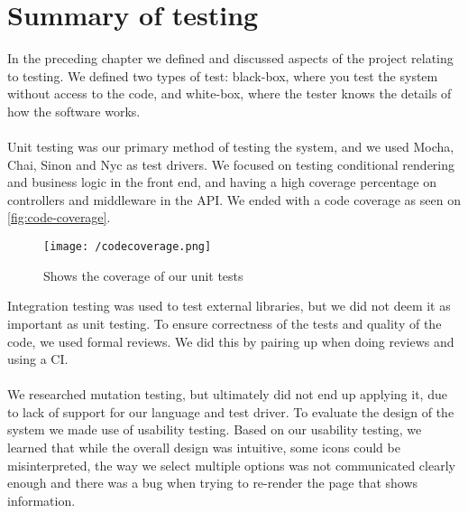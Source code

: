 \section{Summary of testing}
In the preceding chapter we defined and discussed aspects of the project relating to testing.
We defined two types of test: black-box, where you test the system without access to the code, and white-box, where the tester knows the details of how the software works.
\\\\
Unit testing was our primary method of testing the system, and we used Mocha, Chai, Sinon and Nyc as test drivers.
We focused on testing conditional rendering and business logic in the front end, and having a high coverage percentage on controllers and middleware in the API.
We ended with a code coverage as seen on \autoref{fig:code-coverage}.
\begin{figure}[]
    \texttt{[image: /codecoverage.png]}
    \caption{Shows the coverage of our unit tests}
    \label{fig:code-coverage}
\end{figure}
Integration testing was used to test external libraries, but we did not deem it as important as unit testing.
To ensure correctness of the tests and quality of the code, we used formal reviews.
We did this by pairing up when doing reviews and using a CI.
\\\\
We researched mutation testing, but ultimately did not end up applying it, due to lack of support for our language and test driver.
To evaluate the design of the system we made use of usability testing.
Based on our usability testing, we learned that while the overall design was intuitive, some icons could be misinterpreted, the way we select multiple options was not communicated clearly enough and there was a bug when trying to re-render the page that shows information.
